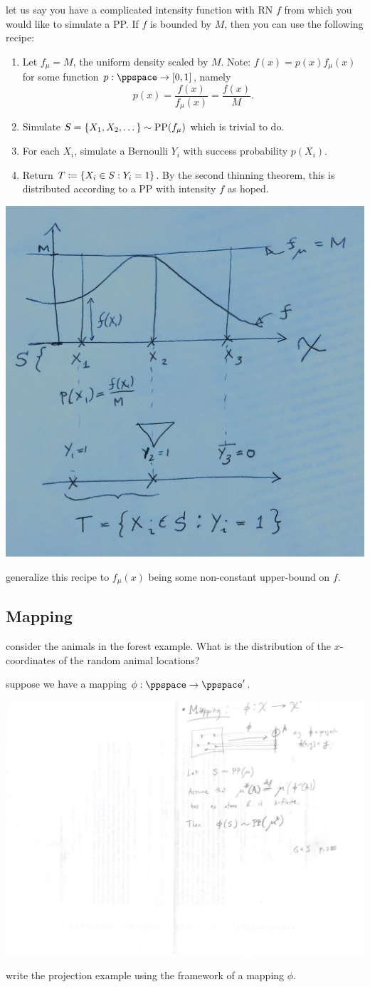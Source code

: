 \documentclass{article}
\begin{document}
 let us say you have a complicated intensity function with RN $f$ from which you would like to simulate a PP. If $f$ is bounded by $M$, then you can use the following recipe:
\begin{enumerate}
	\item Let $f_\mu = M$, the uniform density scaled by $M$. Note: $f(x) = p(x) f_\mu(x)$ for some function $p : \ppspace \to [0, 1]$, namely
	\[ p(x) =  \frac{f(x)}{f_\mu(x)} = \frac{f(x)}{M}. \] 
	\item Simulate $S = \{X_1, X_2, \dots\} \sim \operatorname{PP}(f_\mu)$ which is trivial to do.
	\item For each $X_i$, simulate a Bernoulli $Y_i$ with success probability $p(X_i)$.
	\item Return $T \coloneqq \{X_i \in S : Y_i = 1\}$. By the second thinning theorem, this is distributed according to a PP with intensity $f$ as hoped.
\end{enumerate}
\begin{center}
	\includegraphics[width=0.6\linewidth]{figures/thinning} 
\end{center}

 generalize this recipe to $f_\mu(x)$ being some non-constant upper-bound on $f$. 


\subsection{Mapping}

 consider the animals in the forest example. What is the distribution of the $x$-coordinates of the random animal locations?

 suppose we have a mapping $\phi : \ppspace \to \ppspace'$.
\begin{center}
	\includegraphics[width=0.5\linewidth]{figures/pp-mapping} 
\end{center} 
 write the projection example using the framework of a mapping $\phi$.
\end{document}
